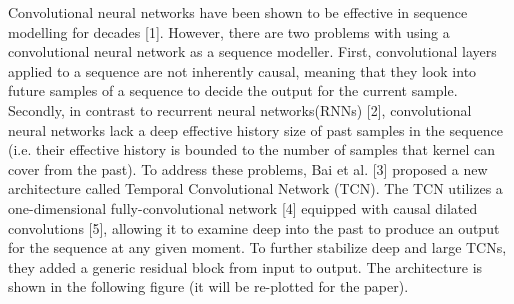 Convolutional neural networks have been shown to be effective in sequence
modelling for decades [1]. However, there are two problems with using a
convolutional neural network as a sequence modeller. First, convolutional layers
applied to a sequence are not inherently causal, meaning that they look into
future samples of a sequence to decide the output for the current sample.
Secondly, in contrast to recurrent neural networks(RNNs) [2], convolutional
neural networks lack a deep effective history size of past samples in the
sequence (i.e. their effective history is bounded to the number of samples that
kernel can cover from the past). To address these problems, Bai et al. [3]
proposed a new architecture called Temporal Convolutional Network (TCN). The TCN
utilizes a one-dimensional fully-convolutional network [4] equipped with causal
dilated convolutions [5], allowing it to examine deep into the past to produce
an output for the sequence at any given moment.  To further stabilize deep and
large TCNs, they added a generic residual block from input to output. The
architecture is shown in the following figure (it will be re-plotted for the
paper).
\fi